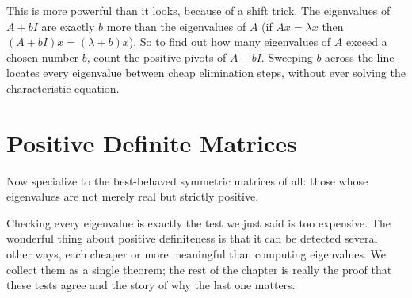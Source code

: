 This is more powerful than it looks, because of a shift trick. The eigenvalues of $A+bI$ are exactly $b$ more than the eigenvalues of $A$ (if $Ax=\lambda x$ then $(A+bI)x=(\lambda+b)x$). So to find out how many eigenvalues of $A$ exceed a chosen number $b$, count the positive pivots of $A-bI$. Sweeping $b$ across the line locates every eigenvalue between cheap elimination steps, without ever solving the characteristic equation.


\section{Positive Definite Matrices}

Now specialize to the best-behaved symmetric matrices of all: those whose eigenvalues are not merely real but strictly positive.


Checking every eigenvalue is exactly the test we just said is too expensive. The wonderful thing about positive definiteness is that it can be detected several other ways, each cheaper or more meaningful than computing eigenvalues. We collect them as a single theorem; the rest of the chapter is really the proof that these tests agree and the story of why the last one matters.

